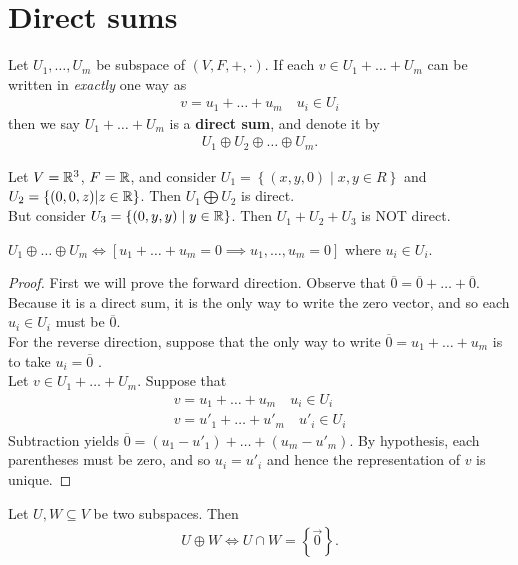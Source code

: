 \documentclass{memoir}
\begin{document}
	\section{Direct sums}
	\begin{defn}
		Let $U_1,\ldots,U_m$ be subspace of $(V,F,+,\cdot )$. If each $v \in U_1 + \ldots +U_m$ can be written in \textit{exactly} one way as
\begin{align*}
	v = u_1 + \ldots +u_m \quad u_i \in  U_i
\end{align*}
		 then we say $U_1 + \ldots + U_m$ is a \textbf{direct sum}, and denote it by
		\begin{align*}
		U_1 \oplus U_2 \oplus \ldots \oplus U_m .
		\end{align*}
	\end{defn}
	\begin{exmp}
	Let $V = \mathbb{R}^{3}$, $F = \mathbb{R}$, and consider $U_1 = \left\{ (x,y,0) \mid x,y \in R \right\} $ and $U_2 = \left\{ (0,0,z) | z \in \mathbb{R} \right\} $. Then $U_1 \bigoplus U_2$ is direct.\\

	But consider $U_3 = \left\{ (0,y,y) \mid y \in \mathbb{R} \right\} $. Then $U_1 + U_2 + U_3$ is NOT direct. 
\end{exmp}
\begin{lemma}
	$U_1 \oplus \ldots \oplus U_m \iff \left[ u_1 + \ldots + u_m = 0 \implies u_1,\ldots,u_m=0\right]$ where $u_i \in U_i$.
\end{lemma}
	\begin{proof}
	First we will prove the forward direction. Observe that $\overline{0} = \overline{0} + \ldots + \overline{0}$. Because it is a direct sum, it is the only way to write the zero vector, and so each $u_i \in U_i$ must be $\overline{0}$. \\ 

	For the reverse direction, suppose that the only way to write $\overline{0} = u_1 + \ldots + u_m$ is to take $u_i = \overline{0}$ . \\ Let $v \in U_1 + \ldots + U_m$. Suppose that
	\begin{align*}
	v = u_1+\ldots+u_m \quad u_i \in U_i \\
	v = u'_1+\ldots+u'_m \quad u'_i \in U_i
	\end{align*}
	Subtraction yields $\overline{0}=(u_1 - u'_1) + \ldots + (u_m - u'_m)$. By hypothesis, each parentheses must be zero, and so \(u_i = u'_i\) and hence the representation of \(v\) is unique.
\end{proof}

\begin{lemma}
Let $U,W \subseteq V$ be two subspaces. Then
\begin{align*}
	U\oplus W \iff U\cap W = \left\{ \vec{0} \right\} . 
\end{align*}
\end{lemma}
\end{document}
